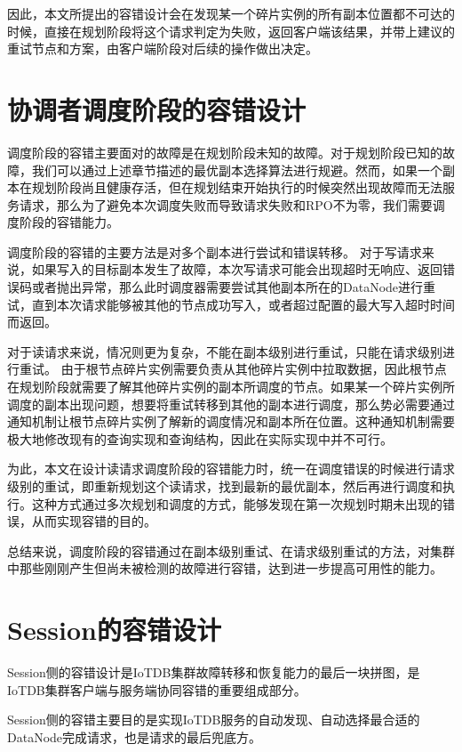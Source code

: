 因此，本文所提出的容错设计会在发现某一个碎片实例的所有副本位置都不可达的时候，直接在规划阶段将这个请求判定为失败，返回客户端该结果，并带上建议的重试节点和方案，由客户端阶段对后续的操作做出决定。


\section{协调者调度阶段的容错设计}\label{sec:failover-schedule}


调度阶段的容错主要面对的故障是在规划阶段未知的故障。对于规划阶段已知的故障，我们可以通过上述章节描述的最优副本选择算法进行规避。然而，如果一个副本在规划阶段尚且健康存活，但在规划结束开始执行的时候突然出现故障而无法服务请求，那么为了避免本次调度失败而导致请求失败和RPO不为零，我们需要调度阶段的容错能力。

调度阶段的容错的主要方法是对多个副本进行尝试和错误转移。
对于写请求来说，如果写入的目标副本发生了故障，本次写请求可能会出现超时无响应、返回错误码或者抛出异常，那么此时调度器需要尝试其他副本所在的DataNode进行重试，直到本次请求能够被其他的节点成功写入，或者超过配置的最大写入超时时间而返回。

对于读请求来说，情况则更为复杂，不能在副本级别进行重试，只能在请求级别进行重试。
由于根节点碎片实例需要负责从其他碎片实例中拉取数据，因此根节点在规划阶段就需要了解其他碎片实例的副本所调度的节点。如果某一个碎片实例所调度的副本出现问题，想要将重试转移到其他的副本进行调度，那么势必需要通过通知机制让根节点碎片实例了解新的调度情况和副本所在位置。这种通知机制需要极大地修改现有的查询实现和查询结构，因此在实际实现中并不可行。

为此，本文在设计读请求调度阶段的容错能力时，统一在调度错误的时候进行请求级别的重试，即重新规划这个读请求，找到最新的最优副本，然后再进行调度和执行。这种方式通过多次规划和调度的方式，能够发现在第一次规划时期未出现的错误，从而实现容错的目的。

总结来说，调度阶段的容错通过在副本级别重试、在请求级别重试的方法，对集群中那些刚刚产生但尚未被检测的故障进行容错，达到进一步提高可用性的能力。

\section{Session的容错设计}

Session侧的容错设计是IoTDB集群故障转移和恢复能力的最后一块拼图，是IoTDB集群客户端与服务端协同容错的重要组成部分。

Session侧的容错主要目的是实现IoTDB服务的自动发现、自动选择最合适的DataNode完成请求，也是请求的最后兜底方。

